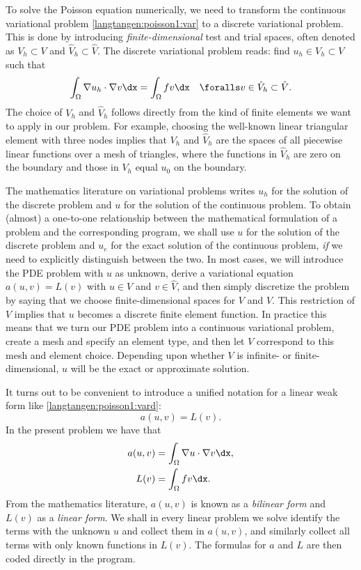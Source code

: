 To solve the Poisson equation numerically, we need to transform
the continuous variational problem \eqref{langtangen:poisson1:var}
to a discrete variational problem. This is done by introducing
\emph{finite-dimensional} test and trial spaces, often denoted as
$V_h\subset V$ and $\hat{V}_h\subset{\hat{V}}$. The discrete variational
problem reads: find $u_h \in V_h \subset V$ such that
\begin{equation} \label{langtangen:poisson1:vard}
  \int_{\Omega} \nabla u_h \cdot \nabla v \dx =
  \int_{\Omega} fv \dx
  \quad \foralls v \in \hat{V}_h \subset \hat{V}.
\end{equation}
The choice of $V_h$ and $\hat{V}_h$ follows directly from the kind of
finite elements we want to apply in our problem. For example, choosing
the well-known linear triangular element with three nodes implies that
$V_h$ and $\hat{V}_h$ are the spaces of all piecewise linear functions
over a mesh of triangles, where the functions in $\hat V_h$ are zero on
the boundary and those in $V_h$ equal $u_0$ on the boundary.

The mathematics literature on variational problems writes $u_h$ for
the solution of the discrete problem and $u$ for the solution of the
continuous problem. To obtain (almost) a one-to-one relationship between
the mathematical formulation of a problem and the corresponding \fenics{}
program, we shall use $u$ for the solution of the discrete problem and
$u_{e}$ for the exact solution of the continuous problem, \emph{if}
we need to explicitly distinguish between the two.  In most cases, we
will introduce the PDE problem with $u$ as unknown, derive a variational
equation $a(u,v)=L(v)$ with $u\in V$ and $v\in \hat V$, and then simply
discretize the problem by saying that we choose finite-dimensional
spaces for $V$ and $\hat V$. This restriction of $V$ implies that $u$
becomes a discrete finite element function. In practice this means that
we turn our PDE problem into a continuous variational problem, create a
mesh and specify an element type, and then let $V$ correspond to this
mesh and element choice.  Depending upon whether $V$ is infinite- or
finite-dimensional, $u$ will be the exact or approximate solution.

It turns out to be convenient to introduce a unified notation for a
linear weak form like \eqref{langtangen:poisson1:vard}:
\begin{equation}
  a(u, v) = L(v).
\end{equation}
In the present problem we have that
\begin{align}
  a(u, v) &= \int_{\Omega} \nabla u \cdot \nabla v \dx,
  \label{langtangen:poisson1:vard:a}
\\
  L(v) &= \int_{\Omega} fv \dx.
\label{langtangen:poisson1:vard:L}
\end{align}
From the mathematics literature, $a(u,v)$ is known as a \emph{bilinear
form} and $L(v)$ as a \emph{linear form}.  We shall in every linear problem
we solve identify the terms with the unknown $u$ and collect them in
$a(u,v)$, and similarly collect all terms with only known functions
in $L(v)$. The formulas for $a$ and $L$ are then coded directly in
the program.

